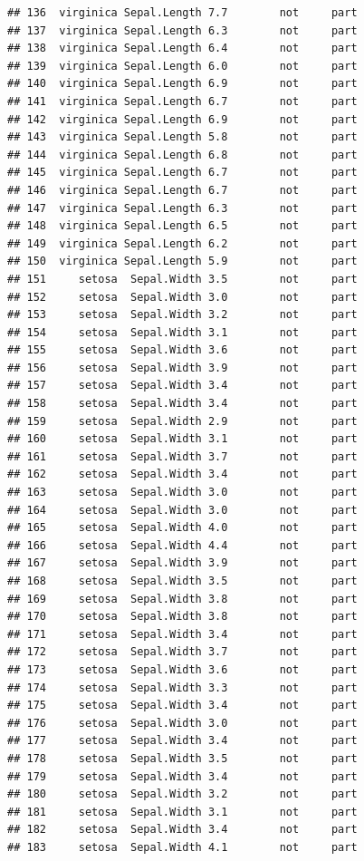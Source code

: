 \documentclass[krantz2]{krantz}\usepackage{knitr}%
\begin{document}
\begin{knitrout}
\begin{kframe}
\begin{verbatim}
## 136  virginica Sepal.Length 7.7        not     part
## 137  virginica Sepal.Length 6.3        not     part
## 138  virginica Sepal.Length 6.4        not     part
## 139  virginica Sepal.Length 6.0        not     part
## 140  virginica Sepal.Length 6.9        not     part
## 141  virginica Sepal.Length 6.7        not     part
## 142  virginica Sepal.Length 6.9        not     part
## 143  virginica Sepal.Length 5.8        not     part
## 144  virginica Sepal.Length 6.8        not     part
## 145  virginica Sepal.Length 6.7        not     part
## 146  virginica Sepal.Length 6.7        not     part
## 147  virginica Sepal.Length 6.3        not     part
## 148  virginica Sepal.Length 6.5        not     part
## 149  virginica Sepal.Length 6.2        not     part
## 150  virginica Sepal.Length 5.9        not     part
## 151     setosa  Sepal.Width 3.5        not     part
## 152     setosa  Sepal.Width 3.0        not     part
## 153     setosa  Sepal.Width 3.2        not     part
## 154     setosa  Sepal.Width 3.1        not     part
## 155     setosa  Sepal.Width 3.6        not     part
## 156     setosa  Sepal.Width 3.9        not     part
## 157     setosa  Sepal.Width 3.4        not     part
## 158     setosa  Sepal.Width 3.4        not     part
## 159     setosa  Sepal.Width 2.9        not     part
## 160     setosa  Sepal.Width 3.1        not     part
## 161     setosa  Sepal.Width 3.7        not     part
## 162     setosa  Sepal.Width 3.4        not     part
## 163     setosa  Sepal.Width 3.0        not     part
## 164     setosa  Sepal.Width 3.0        not     part
## 165     setosa  Sepal.Width 4.0        not     part
## 166     setosa  Sepal.Width 4.4        not     part
## 167     setosa  Sepal.Width 3.9        not     part
## 168     setosa  Sepal.Width 3.5        not     part
## 169     setosa  Sepal.Width 3.8        not     part
## 170     setosa  Sepal.Width 3.8        not     part
## 171     setosa  Sepal.Width 3.4        not     part
## 172     setosa  Sepal.Width 3.7        not     part
## 173     setosa  Sepal.Width 3.6        not     part
## 174     setosa  Sepal.Width 3.3        not     part
## 175     setosa  Sepal.Width 3.4        not     part
## 176     setosa  Sepal.Width 3.0        not     part
## 177     setosa  Sepal.Width 3.4        not     part
## 178     setosa  Sepal.Width 3.5        not     part
## 179     setosa  Sepal.Width 3.4        not     part
## 180     setosa  Sepal.Width 3.2        not     part
## 181     setosa  Sepal.Width 3.1        not     part
## 182     setosa  Sepal.Width 3.4        not     part
## 183     setosa  Sepal.Width 4.1        not     part

\end{verbatim}
\end{kframe}
\end{knitrout}
\end{document}
